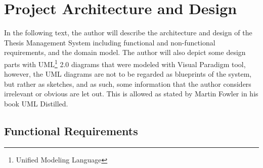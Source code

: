 \chapter{Project Architecture and Design}

In the following text, the author will describe the architecture and design of the Thesis Management System including functional and non-functional requirements, and the domain model. The author will also depict some design parts with UML\footnote{Unified Modeling Language} 2.0 diagrams that were modeled with Visual Paradigm tool\cite{visual-paradigm-homepage}, however, the UML diagrams are not to be regarded as blueprints of the system, but rather as sketches, and as such, some information that the author considers irrelevant or obvious are let out. This is allowed as stated by Martin Fowler in his book UML Distilled\cite{fowler-uml}.

\section{Functional Requirements}

